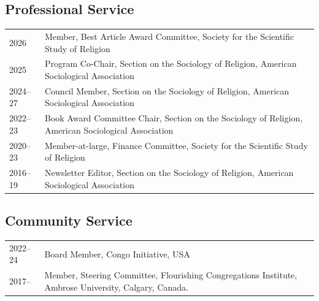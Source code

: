 \subsection*{Professional Service}
\newcommand{\tabitem}{~~\llap{\textbullet}~~}

\begin{tabular}{p{} p{}}
2026 & Member, Best Article Award Committee, Society for the Scientific Study of Religion\\
2025 & Program Co-Chair, Section on the Sociology of Religion, American Sociological Association\\
2024--27 & Council Member, Section on the Sociology of Religion, American Sociological Association\\
2022--23 & Book Award Committee Chair, Section on the Sociology of Religion, American Sociological Association\\
2020--23 & Member-at-large, Finance Committee, Society for the Scientific Study of Religion\\
2016--19 & Newsletter Editor, Section on the Sociology of Religion, American Sociological Association\\
\end{tabular}

\subsection*{Community Service}
\begin{tabular}{p{} p{}}
	2022--24 & Board Member, Congo Initiative, USA\\
	2017-- & Member, Steering Committee, Flourishing Congregations Institute, Ambrose University, Calgary, Canada.\\
\end{tabular}



